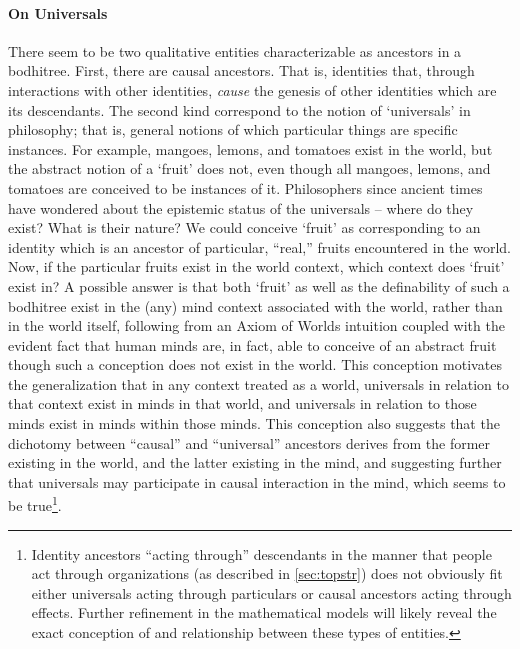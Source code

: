\documentclass[pra,twocolumn,groupedaddress,10pt]{revtex4}
\theoremstyle{definition}
\begin{document}
\paragraph{On Universals} \label{sec:onuni} There seem to be two qualitative entities characterizable as ancestors in a bodhitree. First, there are causal ancestors. That is, identities that, through interactions with other identities, \emph{cause} the genesis of other identities which are its descendants. The second kind correspond to the notion of `universals' in philosophy; that is, general notions of which particular things are specific instances. For example, mangoes, lemons, and tomatoes exist in the world, but the abstract notion of a `fruit' does not, even though all mangoes, lemons, and tomatoes are conceived to be instances of it. Philosophers since ancient times have wondered about the epistemic status of the universals -- where do they exist? What is their nature? We could conceive `fruit' as corresponding to an identity which is an ancestor of particular, ``real,'' fruits encountered in the world. Now, if the particular fruits exist in the world context, which context does `fruit' exist in? A possible answer is that both `fruit' as well as the definability of such a bodhitree exist in the (any) mind context associated with the world, rather than in the world itself, following from an Axiom of Worlds intuition coupled with the evident fact that human minds are, in fact, able to conceive of an abstract fruit though such a conception does not exist in the world. This conception motivates the generalization that in any context treated as a world, universals in relation to that context exist in minds in that world, and universals in relation to those minds exist in minds within those minds. This conception also suggests that the dichotomy between ``causal'' and ``universal'' ancestors derives from the former existing in the world, and the latter existing in the mind, and suggesting further that universals may participate in causal interaction in the mind, which seems to be true\footnote{Identity ancestors ``acting through'' descendants in the manner that people act through organizations (as described in \autoref{sec:topstr}) does not obviously fit either universals acting through particulars or causal ancestors acting through effects. Further refinement in the mathematical models will likely reveal the exact conception of and relationship between these types of entities.}.
\end{document}
